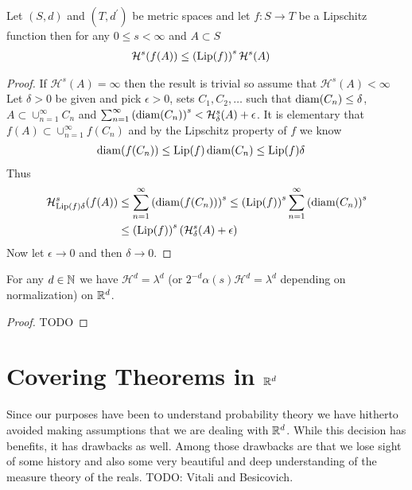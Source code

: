 \begin{prop}\label{HausdorffMeasureUnderLipschitzMaps}Let $(S,d)$ and $(T,d^\prime)$ be metric spaces and let $f : S \to T$ be a Lipschitz function then for any $0 \leq s < \infty$ and $A \subset S$
\begin{align*}
\mathcal{H}^s(f(A)) &\leq \left ( \operatorname*{Lip}(f) \right)^s \mathcal{H}^s(A)
\end{align*}
\end{prop}
\begin{proof}
If $\mathcal{H}^s(A)=\infty$ then the result is trivial so assume that $\mathcal{H}^s(A)<\infty$
Let $\delta>0$ be given and pick $\epsilon>0$, sets $C_1, C_2, \dotsc$ such that $\operatorname*{diam}(C_n) \leq \delta$, $A \subset \cup_{n=1}^\infty C_n$ and $\sum_{n=1}^\infty \left(\operatorname*{diam}(C_n)\right)^s < \mathcal{H}^s_\delta(A)+\epsilon$.  It is elementary that $f(A) \subset \cup_{n=1}^\infty f(C_n)$ and by the Lipschitz property of $f$ we
know
\begin{align*}
\operatorname*{diam}(f(C_n)) &\leq \operatorname*{Lip}(f) \operatorname*{diam}(C_n) \leq \operatorname*{Lip}(f) \delta
\end{align*}
Thus 
\begin{align*}
\mathcal{H}_{\operatorname*{Lip}(f) \delta}^s (f(A)) &\leq \sum_{n=1}^\infty \left(\operatorname*{diam}(f(C_n))\right)^s \leq \left(\operatorname*{Lip}(f) \right)^s \sum_{n=1}^\infty\left(\operatorname*{diam}(C_n)\right)^s \\
&\leq \left(\operatorname*{Lip}(f) \right)^s \left(\mathcal{H}^s_\delta(A)+\epsilon\right )
\end{align*}
Now let $\epsilon \to 0$ and then $\delta \to 0$.
\end{proof}

\begin{thm}\label{HausdorffEqualsLebesgue}For any $d \in \mathbb{N}$ we have $\mathcal{H}^d =
  \lambda^d$ (or $ 2^{-d} \alpha(s) \mathcal{H}^d =\lambda^d$ depending on normalization) on $\mathbb{R}^d$.
\end{thm}
\begin{proof}
TODO
\end{proof}

\section{Covering Theorems in $\mathbb{R}^d$}

Since our purposes have been to understand probability theory we have
hitherto avoided making assumptions that we are dealing with
$\mathbb{R}^d$.  While this decision has benefits, it has drawbacks as
well.  Among those drawbacks are that we lose sight of some history and also some very
beautiful and deep understanding of the measure theory of the reals.
TODO: Vitali and Besicovich.

